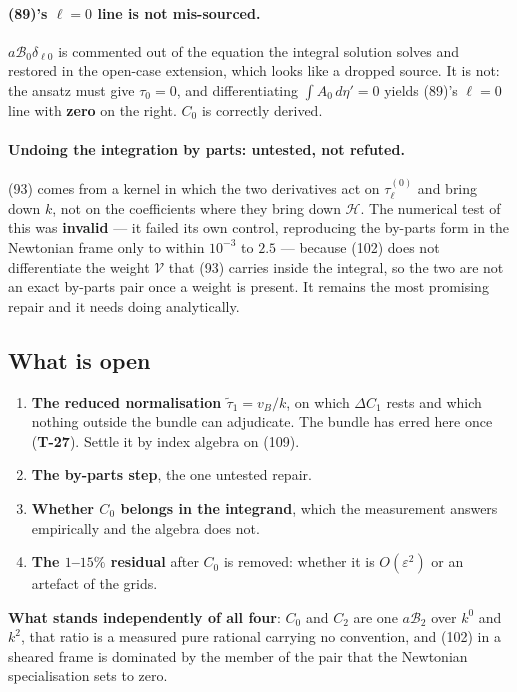 \paragraph{(89)'s $\ell=0$ line is not mis-sourced.} $a\mathcal B_0\delta_{\ell0}$
is commented out of the equation the integral solution solves and restored in
the open-case extension, which looks like a dropped source. It is not: the
ansatz must give $\tau_0=0$, and differentiating $\int A_0\,d\eta'=0$ yields
(89)'s $\ell=0$ line with \textbf{zero} on the right. $C_0$ is correctly
derived.

\paragraph{Undoing the integration by parts: untested, not refuted.} (93) comes
from a kernel in which the two derivatives act on $\tau^{(0)}_\ell$ and bring
down $k$, not on the coefficients where they bring down $\mathcal H$. The
numerical test of this was \textbf{invalid} --- it failed its own control,
reproducing the by-parts form in the Newtonian frame only to within $10^{-3}$
to $2.5$ --- because (102) does not differentiate the weight $\mathcal V$ that
(93) carries inside the integral, so the two are not an exact by-parts pair
once a weight is present. It remains the most promising repair and it needs
doing analytically.

\subsection{What is open}

\begin{enumerate}
\item \textbf{The reduced normalisation $\tilde\tau_1=v_B/k$}, on which
  $\Delta C_1$ rests and which nothing outside the bundle can adjudicate. The
  bundle has erred here once (\textbf{T-27}). Settle it by index algebra on (109).
\item \textbf{The by-parts step}, the one untested repair.
\item \textbf{Whether $C_0$ belongs in the integrand}, which the measurement
  answers empirically and the algebra does not.
\item \textbf{The $1$--$15\%$ residual} after $C_0$ is removed: whether it is
  $O(\varepsilon^2)$ or an artefact of the grids.
\end{enumerate}

\textbf{What stands independently of all four}: $C_0$ and $C_2$ are one
$a\mathcal B_2$ over $k^0$ and $k^2$, that ratio is a measured pure rational
carrying no convention, and (102) in a sheared frame is dominated by the
member of the pair that the Newtonian specialisation sets to zero.
